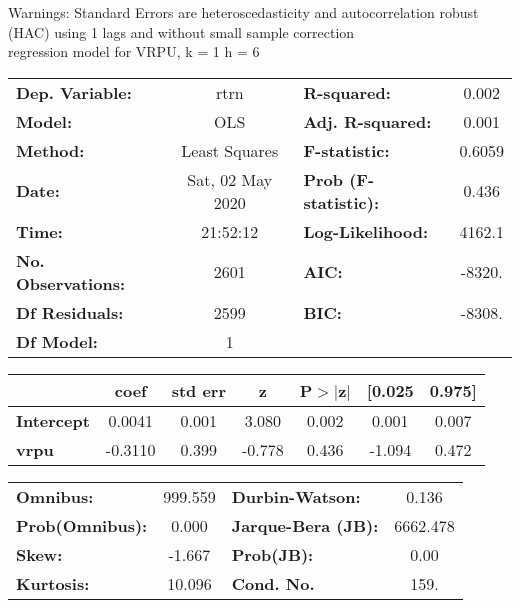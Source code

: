 Warnings: \newline
 [1] Standard Errors are heteroscedasticity and autocorrelation robust (HAC) using 1 lags and without small sample correction\\ 

regression model for VRPU, k = 1 h = 6\begin{center}
\begin{tabular}{lclc}
\toprule
\textbf{Dep. Variable:}    &       rtrn       & \textbf{  R-squared:         } &     0.002   \\
\textbf{Model:}            &       OLS        & \textbf{  Adj. R-squared:    } &     0.001   \\
\textbf{Method:}           &  Least Squares   & \textbf{  F-statistic:       } &    0.6059   \\
\textbf{Date:}             & Sat, 02 May 2020 & \textbf{  Prob (F-statistic):} &    0.436    \\
\textbf{Time:}             &     21:52:12     & \textbf{  Log-Likelihood:    } &    4162.1   \\
\textbf{No. Observations:} &        2601      & \textbf{  AIC:               } &    -8320.   \\
\textbf{Df Residuals:}     &        2599      & \textbf{  BIC:               } &    -8308.   \\
\textbf{Df Model:}         &           1      & \textbf{                     } &             \\
\bottomrule
\end{tabular}
\begin{tabular}{lcccccc}
                   & \textbf{coef} & \textbf{std err} & \textbf{z} & \textbf{P$> |$z$|$} & \textbf{[0.025} & \textbf{0.975]}  \\
\midrule
\textbf{Intercept} &       0.0041  &        0.001     &     3.080  &         0.002        &        0.001    &        0.007     \\
\textbf{vrpu}      &      -0.3110  &        0.399     &    -0.778  &         0.436        &       -1.094    &        0.472     \\
\bottomrule
\end{tabular}
\begin{tabular}{lclc}
\textbf{Omnibus:}       & 999.559 & \textbf{  Durbin-Watson:     } &    0.136  \\
\textbf{Prob(Omnibus):} &   0.000 & \textbf{  Jarque-Bera (JB):  } & 6662.478  \\
\textbf{Skew:}          &  -1.667 & \textbf{  Prob(JB):          } &     0.00  \\
\textbf{Kurtosis:}      &  10.096 & \textbf{  Cond. No.          } &     159.  \\
\bottomrule
\end{tabular}
\end{center}

